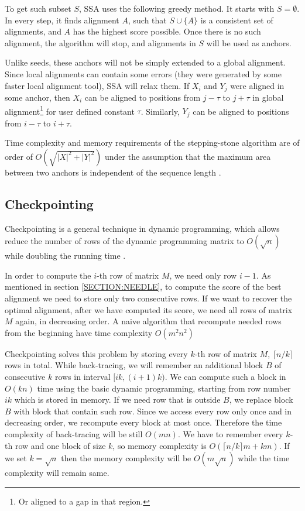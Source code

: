 To get such subset $S$, SSA uses the following greedy method. It starts with
$S=\emptyset$. In every step, it finds alignment $A$, such that $S\cup\{A\}$ is
a consistent set of alignments, and $A$ has the highest score possible. Once there is no
such alignment, the algorithm will stop, and alignments in  $S$
will be used as anchors.

Unlike seeds, these anchors will not be simply extended to a global alignment. Since
local alignments can contain some errors (they were generated by some faster
local alignment tool), SSA will relax them. If $X_i$ and $Y_j$ were aligned in
some anchor, then $X_i$ can be aligned to positions from $j-\tau$ to $j+\tau$ in
global alignment\footnote{Or aligned to a gap in that region.} for user defined
constant $\tau$. Similarly, $Y_j$ can be aligned to positions from $i-\tau$ to
$i+\tau$.

Time complexity and memory requirements of the stepping-stone algorithm are of
order of $O(\sqrt{|X|^2+|Y|^2})$ under the assumption that the maximum area between
two anchors is independent of the sequence length \cite{Meyer2002}.


\subsection{Checkpointing}

Checkpointing is a general technique in dynamic programming, which allows reduce
the number of rows of the dynamic programming matrix to $O(\sqrt n)$ while
doubling the running time
\cite{Grice1997}. 

In order to compute the $i$-th row of matrix $M$, we need only row $i-1$. As
mentioned in section \ref{SECTION:NEEDLE}, to compute the score of the best
alignment we need to store only
two consecutive rows.  If we want to
recover the optimal alignment, after we have computed its score, we need all
rows of matrix $M$ again, in decreasing order.
A naive algorithm that recompute needed rows from the beginning have
time complexity $O(m^2n^2)$

Checkpointing solves this problem by storing every $k$-th row of matrix $M$,
$\lceil n/k\rceil$ rows in total.  While back-tracing, we
will remember an additional block $B$ of consecutive $k$ rows in interval
$[ik,(i+1)k)$. We can compute such a block in $O(kn)$ time using the basic
 dynamic programming, starting from row number $ik$ which is stored in memory.  If we need row that
is outside $B$, we replace block $B$ with block that contain such row. Since we
access every row only once and in decreasing order, we recompute every block at
most once. Therefore the time complexity of back-tracing will be still $O(mn)$. We
have to remember every $k$-th row and one block of size $k$, so memory
complexity is $O(\lceil n/k\rceil m+ km)$. If we set $k=\sqrt n$ then the memory
complexity will be $O(m\sqrt n)$ while the time complexity will remain same.


